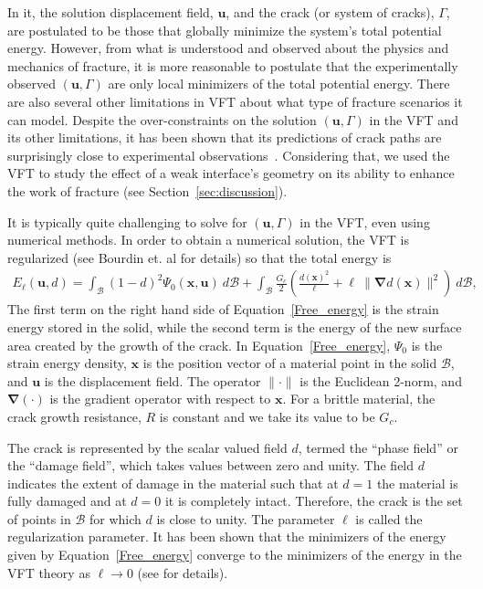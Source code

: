 \documentclass[12pt,onecolumn]{article}
\newcommand{\bs}[1]{\ensuremath{\mathbf{#1}}}
\begin{document}
\begin{bibunit}
In it, the solution displacement field, $\bs{u}$, and the  crack (or system of cracks), $\Gamma$, are postulated to be those that globally minimize the system's total potential energy. However, from what is understood and observed about the  physics and mechanics of fracture, it is more reasonable to postulate that the experimentally observed $(\bs{u},\Gamma)$ are only local minimizers of the total potential energy. There are also several other limitations in VFT about what type of fracture scenarios it can model. Despite  the over-constraints on the solution $(\bs{u},\Gamma)$ in the VFT and its other limitations, it has been shown that its  predictions of crack paths are surprisingly close to experimental observations~\cite{borden_2012,bourdin2000numerical}. Considering that, we used the VFT to study the effect of a weak interface's geometry on its ability to enhance the work of fracture (see Section~\ref{sec:discussion}). 
 
It is typically quite challenging to solve for $(\bs{u},\Gamma)$ in the VFT, even using numerical methods. In order to obtain a numerical solution, the VFT is regularized (see Bourdin et. al \cite{bourdin2000numerical} for details) so that the total energy is 
%
  \begin{align}\label{Free_energy}
	E_{\ell}(\bs{u},d) = \int_\mathcal{B} (1-d)^2\Psi_0(\bs{x},\bs{u}) \ d\mathcal{B} + \int_\mathcal{B} \frac{G_c}{2} \left(\frac{d(\bs{x})^2}{\ell} + \ell~ \lVert\bm{\nabla}d(\bs{x})\rVert^2\right) \ d\mathcal{B},  
\end{align}
%
The first term on the right hand side of Equation~\eqref{Free_energy} is the strain energy stored in the solid, while the second term is the energy of the new surface area created by the growth of the crack. In Equation~\eqref{Free_energy}, $\Psi_0$ is the strain energy density, $\bs{x}$ is the position vector of a material point in the solid $\mathcal{B}$, and $\bs{u}$ is the displacement field. The operator $\lVert \cdot \rVert$ is the Euclidean 2-norm, and $\bm{\nabla}(\cdot)$ is the gradient operator with respect to $\bs{x}$. For a brittle material, the crack growth resistance, $R$ is constant and we take its value to be $G_c$.

The crack is represented by the scalar valued field $d$, termed the ``phase field'' or the ``damage field'', which takes values between zero and unity. The field $d$ indicates the extent of damage in the material such that at $d=1$ the material is fully damaged  and at $d=0$ it is completely intact. Therefore, the crack is the set of points in $\mathcal{B}$ for which $d$ is close to unity. The parameter $\ell$ is called the regularization parameter. It has been shown  that the minimizers of the energy given by Equation~\eqref{Free_energy} converge to the minimizers of the energy in the VFT theory as $\ell \to 0$ (see \cite{chambolle_2005,ambrosio_1990a,bourdin_2008} for details). 


\end{bibunit}
\end{document}
